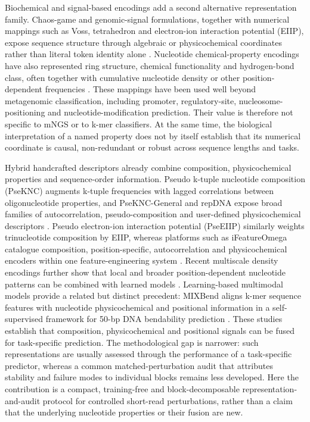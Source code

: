Biochemical and signal-based encodings add a second alternative representation family. Chaos-game and genomic-signal formulations, together with numerical mappings such as Voss, tetrahedron and electron-ion interaction potential (EIIP), expose sequence structure through algebraic or physicochemical coordinates rather than literal token identity alone \citep{Jeffrey1990,Voss1992,Anastassiou2001,Cristea2002,MendizabalRuiz2017,MendizabalRuiz2018GSP,Nair2006}. Nucleotide chemical-property encodings have also represented ring structure, chemical functionality and hydrogen-bond class, often together with cumulative nucleotide density or other position-dependent frequencies \citep{Chen2017iDNA4mC}. These mappings have been used well beyond metagenomic classification, including promoter, regulatory-site, nucleosome-positioning and nucleotide-modification prediction. Their value is therefore not specific to mNGS or to k-mer classifiers. At the same time, the biological interpretation of a named property does not by itself establish that its numerical coordinate is causal, non-redundant or robust across sequence lengths and tasks.

Hybrid handcrafted descriptors already combine composition, physicochemical properties and sequence-order information. Pseudo k-tuple nucleotide composition (PseKNC) augments k-tuple frequencies with lagged correlations between oligonucleotide properties, and PseKNC-General and repDNA expose broad families of autocorrelation, pseudo-composition and user-defined physicochemical descriptors \citep{Chen2014PseKNC,Chen2015PseKNCGeneral,Liu2015repDNA}. Pseudo electron-ion interaction potential (PseEIIP) similarly weights trinucleotide composition by EIIP, whereas platforms such as iFeatureOmega catalogue composition, position-specific, autocorrelation and physicochemical encoders within one feature-engineering system \citep{He2018PseEIIP,Chen2022iFeatureOmega}. Recent multiscale density encodings further show that local and broader position-dependent nucleotide patterns can be combined with learned models \citep{Zabihi2026EDEN}. Learning-based multimodal models provide a related but distinct precedent: MIXBend aligns k-mer sequence features with nucleotide physicochemical and positional information in a self-supervised framework for 50-bp DNA bendability prediction \citep{Yang2024MIXBend}. These studies establish that composition, physicochemical and positional signals can be fused for task-specific prediction. The methodological gap is narrower: such representations are usually assessed through the performance of a task-specific predictor, whereas a common matched-perturbation audit that attributes stability and failure modes to individual blocks remains less developed. Here the contribution is a compact, training-free and block-decomposable representation-and-audit protocol for controlled short-read perturbations, rather than a claim that the underlying nucleotide properties or their fusion are new.

